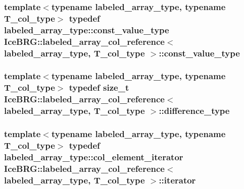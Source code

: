 \subsubsection[{const\+\_\+value\+\_\+type}]{\setlength{\rightskip}{0pt plus 5cm}template$<$typename labeled\+\_\+array\+\_\+type, typename T\+\_\+col\+\_\+type$>$ typedef labeled\+\_\+array\+\_\+type\+::const\+\_\+value\+\_\+type {\bf Ice\+B\+R\+G\+::labeled\+\_\+array\+\_\+col\+\_\+reference}$<$ labeled\+\_\+array\+\_\+type, T\+\_\+col\+\_\+type $>$\+::{\bf const\+\_\+value\+\_\+type}}\label{classIceBRG_1_1labeled__array__col__reference_a035a727159f4298ef4f4a360e6bc8aa8}
\hypertarget{classIceBRG_1_1labeled__array__col__reference_a8b2c27327495b8f17cf4ac9fbf667d54}{}
\subsubsection[{difference\+\_\+type}]{\setlength{\rightskip}{0pt plus 5cm}template$<$typename labeled\+\_\+array\+\_\+type, typename T\+\_\+col\+\_\+type$>$ typedef size\+\_\+t {\bf Ice\+B\+R\+G\+::labeled\+\_\+array\+\_\+col\+\_\+reference}$<$ labeled\+\_\+array\+\_\+type, T\+\_\+col\+\_\+type $>$\+::{\bf difference\+\_\+type}}\label{classIceBRG_1_1labeled__array__col__reference_a8b2c27327495b8f17cf4ac9fbf667d54}
\hypertarget{classIceBRG_1_1labeled__array__col__reference_a02a1708be2729e266d767b9a58d1880e}{}
\subsubsection[{iterator}]{\setlength{\rightskip}{0pt plus 5cm}template$<$typename labeled\+\_\+array\+\_\+type, typename T\+\_\+col\+\_\+type$>$ typedef labeled\+\_\+array\+\_\+type\+::col\+\_\+element\+\_\+iterator {\bf Ice\+B\+R\+G\+::labeled\+\_\+array\+\_\+col\+\_\+reference}$<$ labeled\+\_\+array\+\_\+type, T\+\_\+col\+\_\+type $>$\+::{\bf iterator}}\label{classIceBRG_1_1labeled__array__col__reference_a02a1708be2729e266d767b9a58d1880e}
\hypertarget{classIceBRG_1_1labeled__array__col__reference_a8dc48f0fd0cd4b9813289a8b6db0f9b6}{}
